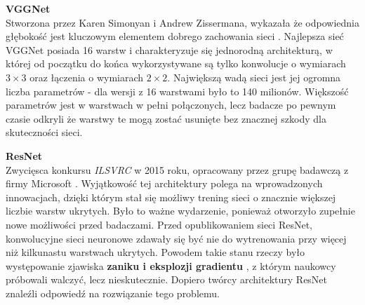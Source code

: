 \begin{enumerate*}
\item \textbf{VGGNet} \\
Stworzona przez Karen Simonyan i Andrew Zissermana, wykazała że odpowiednia głębokość jest kluczowym elementem dobrego zachowania sieci \cite{vggNet:article}. Najlepsza sieć VGGNet posiada 16 warstw i charakteryzuje się jednorodną architekturą, w której od początku do końca wykorzystywane są tylko konwolucje o wymiarach $3 \times 3$ oraz łączenia o wymiarach $2 \times 2$.  Największą wadą sieci jest jej ogromna liczba parametrów - dla wersji z 16 warstwami było to 140 milionów. Większość parametrów jest w warstwach w pełni połączonych, lecz badacze po pewnym czasie odkryli że warstwy te mogą zostać usunięte bez znacznej szkody dla skuteczności sieci.
\item \textbf{ResNet} \\
Zwycięsca konkursu \textit{ILSVRC} w 2015 roku, opracowany przez grupę badawczą z firmy Microsoft \cite{resnet:article}. Wyjątkowość tej architektury polega na wprowadzonych innowacjach, dzięki którym stał się możliwy trening sieci o znacznie większej liczbie warstw ukrytych. Było to ważne wydarzenie, ponieważ otworzyło zupełnie nowe możliwości przed badaczami. Przed opublikowaniem sieci ResNet, konwolucyjne sieci neuronowe zdawały się być nie do wytrenowania przy więcej niż kilkunastu warstwach ukrytych. Powodem takie stanu rzeczy było występowanie zjawiska \textbf{zaniku i eksplozji gradientu} \cite{bohra:vanishingGradient}, z którym naukowcy próbowali walczyć, lecz nieskutecznie. Dopiero twórcy architektury ResNet znaleźli odpowiedź na rozwiązanie tego problemu.
\end{enumerate*}

